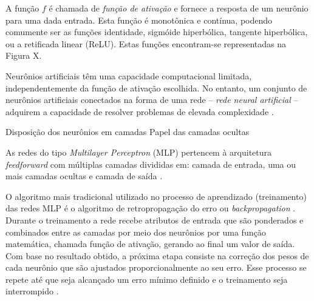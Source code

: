 A função $f$ é chamada de \emph{função de ativação} e fornece a resposta de um neurônio para uma dada entrada. Esta função é monotônica e contínua, podendo comumente ser as funções identidade, sigmóide hiperbólica, tangente hiperbólica, ou a retificada linear (ReLU). Estas funções encontram-se representadas na Figura X.

Neurônios artificiais têm uma capacidade computacional limitada, independentemente da função de ativação escolhida. No entanto, um conjunto de neurônios artificiais conectados na forma de uma rede -- \emph{rede neural artificial} -- adquirem a capacidade de resolver problemas de elevada complexidade \cite{Teresa:Livro}.


Disposição dos neurônios em camadas
Papel das camadas ocultas














 As redes do tipo \textit{Multilayer Perceptron} (MLP) pertencem à arquitetura \textit{feedforward} com múltiplas camadas divididas em: camada de entrada, uma ou mais camadas ocultas e camada de saída \cite{ref10:faceli}.

O algoritmo mais tradicional utilizado no processo de aprendizado (treinamento) das redes MLP é o algoritmo de retropropagação do erro ou \textit{backpropagation} \cite{ref11:teive}. Durante o treinamento a rede recebe atributos de entrada que são ponderados e combinados entre as camadas por meio dos neurônios por uma função matemática, chamada função de ativação, gerando ao final um valor de saída. Com base no resultado obtido, a próxima etapa consiste na correção dos pesos de cada neurônio que são ajustados proporcionalmente ao seu erro. Esse processo se repete até que seja alcançado um erro mínimo definido e o treinamento seja interrompido \cite{ref10:faceli,ref1:guedes,ref5:aguni}.

